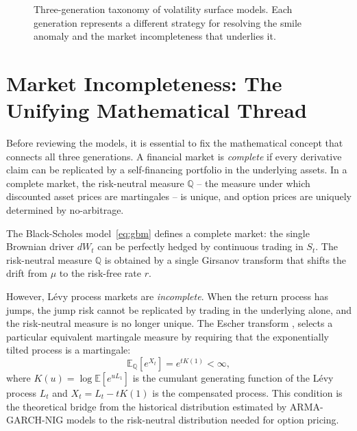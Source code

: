 \documentclass[12pt, a4paper]{article}
\begin{document}
\begin{figure}[H]
\caption{Three-generation taxonomy of volatility surface models.
Each generation represents a different strategy for resolving the smile
anomaly and the market incompleteness that underlies it.}
\label{fig:taxonomy}
\end{figure}

\section{Market Incompleteness: The Unifying Mathematical Thread}

Before reviewing the models, it is essential to fix the mathematical
concept that connects all three generations. A financial market is
\emph{complete} if every derivative claim can be replicated by a
self-financing portfolio in the underlying assets. In a complete market,
the risk-neutral measure $\mathbb{Q}$ -- the measure under which
discounted asset prices are martingales -- is unique, and option prices
are uniquely determined by no-arbitrage.

The Black-Scholes model~\eqref{eq:gbm} defines a complete market: the
single Brownian driver $dW_t$ can be perfectly hedged by continuous
trading in $S_t$. The risk-neutral measure $\mathbb{Q}$ is obtained by
a single Girsanov transform that shifts the drift from $\mu$ to the
risk-free rate $r$.

However, L\'{e}vy process markets are
\emph{incomplete}. When the return process has jumps, the jump risk
cannot be replicated by trading in the underlying alone, and the
risk-neutral measure is no longer unique. The Escher transform
\citep{escher1932}, selects a particular
equivalent martingale measure by requiring that the exponentially tilted
process is a martingale:
\begin{equation}
  \mathbb{E}_{\mathbb{Q}}\!\left[e^{X_t}\right] = e^{tK(1)} < \infty,
  \label{eq:escher}
\end{equation}
where $K(u) = \log \mathbb{E}[e^{uL_1}]$ is the cumulant generating
function of the L\'{e}vy process $L_t$ and $X_t = L_t - tK(1)$ is the
compensated process. This condition is the theoretical bridge from the historical distribution
estimated by ARMA-GARCH-NIG models to the risk-neutral distribution
needed for option pricing.
\end{document}
